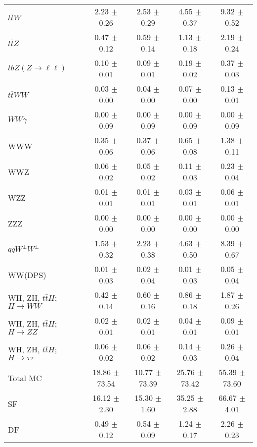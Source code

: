 \begin{tabular}{l|cccc}
                   $t\overline{t}W$ &  2.23 $\pm$  0.26 &  2.53 $\pm$  0.29 &  4.55 $\pm$  0.37 &  9.32 $\pm$  0.52 \\
                   $t\overline{t}Z$ &  0.47 $\pm$  0.12 &  0.59 $\pm$  0.14 &  1.13 $\pm$  0.18 &  2.19 $\pm$  0.24 \\
    $tbZ (Z \rightarrow \ell \ell)$ &  0.10 $\pm$  0.01 &  0.09 $\pm$  0.01 &  0.19 $\pm$  0.02 &  0.37 $\pm$  0.03 \\
                  $t\overline{t}WW$ &  0.03 $\pm$  0.00 &  0.04 $\pm$  0.00 &  0.07 $\pm$  0.00 &  0.13 $\pm$  0.01 \\
                         $WW\gamma$ &  0.00 $\pm$  0.09 &  0.00 $\pm$  0.09 &  0.00 $\pm$  0.09 &  0.00 $\pm$  0.09 \\
                                WWW &  0.35 $\pm$  0.06 &  0.37 $\pm$  0.06 &  0.65 $\pm$  0.08 &  1.38 $\pm$  0.11 \\
                                WWZ &  0.06 $\pm$  0.02 &  0.05 $\pm$  0.02 &  0.11 $\pm$  0.03 &  0.23 $\pm$  0.04 \\
                                WZZ &  0.01 $\pm$  0.01 &  0.01 $\pm$  0.01 &  0.03 $\pm$  0.01 &  0.06 $\pm$  0.01 \\
                                ZZZ &  0.00 $\pm$  0.00 &  0.00 $\pm$  0.00 &  0.00 $\pm$  0.00 &  0.00 $\pm$  0.00 \\
                 $qqW^{\pm}W^{\pm}$ &  1.53 $\pm$  0.32 &  2.23 $\pm$  0.38 &  4.63 $\pm$  0.50 &  8.39 $\pm$  0.67 \\
                            WW(DPS) &  0.01 $\pm$  0.03 &  0.02 $\pm$  0.04 &  0.01 $\pm$  0.03 &  0.05 $\pm$  0.04 \\
WH, ZH, $t\bar{t}H$; $H \rightarrow WW$ &  0.42 $\pm$  0.14 &  0.60 $\pm$  0.16 &  0.86 $\pm$  0.18 &  1.87 $\pm$  0.26 \\
WH, ZH, $t\bar{t}H$; $H \rightarrow ZZ$ &  0.02 $\pm$  0.01 &  0.02 $\pm$  0.01 &  0.04 $\pm$  0.01 &  0.09 $\pm$  0.01 \\
WH, ZH, $t\bar{t}H$; $H \rightarrow \tau\tau$ &  0.06 $\pm$  0.02 &  0.06 $\pm$  0.02 &  0.14 $\pm$  0.03 &  0.26 $\pm$  0.04 \\
\hline\hline
                           Total MC & 18.86 $\pm$ 73.54 & 10.77 $\pm$ 73.39 & 25.76 $\pm$ 73.42 & 55.39 $\pm$ 73.60 \\
\hline
                                 SF & 16.12 $\pm$  2.30 & 15.30 $\pm$  1.60 & 35.25 $\pm$  2.88 & 66.67 $\pm$  4.01 \\
                                 DF &  0.49 $\pm$  0.12 &  0.54 $\pm$  0.09 &  1.24 $\pm$  0.17 &  2.26 $\pm$  0.23 \\

\end{tabular}
